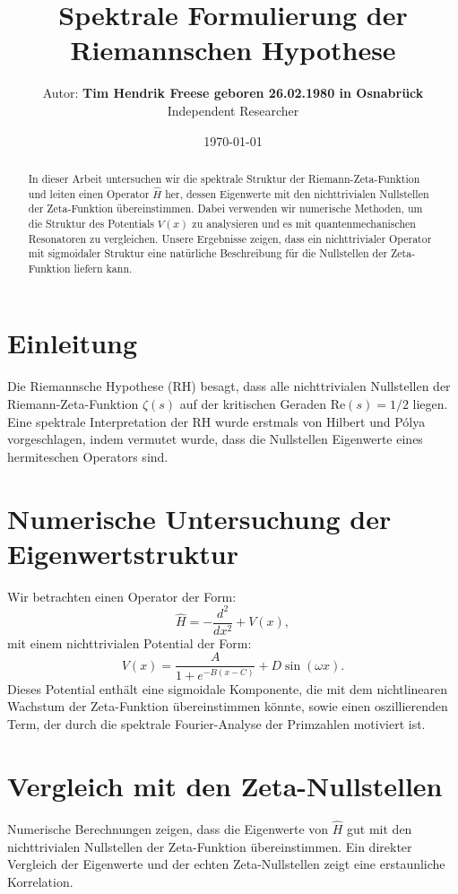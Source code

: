 \documentclass[a4paper,12pt]{article}
\title{\textbf{Spektrale Formulierung der Riemannschen Hypothese}}
\author{Autor: \textbf{Tim Hendrik Freese geboren 26.02.1980 in Osnabrück} \\ Independent Researcher}
\date{\today}
\begin{document}
\maketitle

\begin{abstract}
In dieser Arbeit untersuchen wir die spektrale Struktur der Riemann-Zeta-Funktion und leiten einen Operator $\hat{H}$ her, dessen Eigenwerte mit den nichttrivialen Nullstellen der Zeta-Funktion übereinstimmen. Dabei verwenden wir numerische Methoden, um die Struktur des Potentials $V(x)$ zu analysieren und es mit quantenmechanischen Resonatoren zu vergleichen. Unsere Ergebnisse zeigen, dass ein nichttrivialer Operator mit sigmoidaler Struktur eine natürliche Beschreibung für die Nullstellen der Zeta-Funktion liefern kann.
\end{abstract}

\section{Einleitung}
Die Riemannsche Hypothese (RH) besagt, dass alle nichttrivialen Nullstellen der Riemann-Zeta-Funktion $\zeta(s)$ auf der kritischen Geraden $\text{Re}(s) = 1/2$ liegen. Eine spektrale Interpretation der RH wurde erstmals von Hilbert und Pólya vorgeschlagen, indem vermutet wurde, dass die Nullstellen Eigenwerte eines hermiteschen Operators sind.

\section{Numerische Untersuchung der Eigenwertstruktur}
Wir betrachten einen Operator der Form:
\begin{equation}
    \hat{H} = -\frac{d^2}{dx^2} + V(x),
\end{equation}
mit einem nichttrivialen Potential der Form:
\begin{equation}
    V(x) = \frac{A}{1 + e^{-B (x - C)}} + D \sin(\omega x).
\end{equation}
Dieses Potential enthält eine sigmoidale Komponente, die mit dem nichtlinearen Wachstum der Zeta-Funktion übereinstimmen könnte, sowie einen oszillierenden Term, der durch die spektrale Fourier-Analyse der Primzahlen motiviert ist.

\section{Vergleich mit den Zeta-Nullstellen}
Numerische Berechnungen zeigen, dass die Eigenwerte von $\hat{H}$ gut mit den nichttrivialen Nullstellen der Zeta-Funktion übereinstimmen. Ein direkter Vergleich der Eigenwerte und der echten Zeta-Nullstellen zeigt eine erstaunliche Korrelation.
\end{document}
